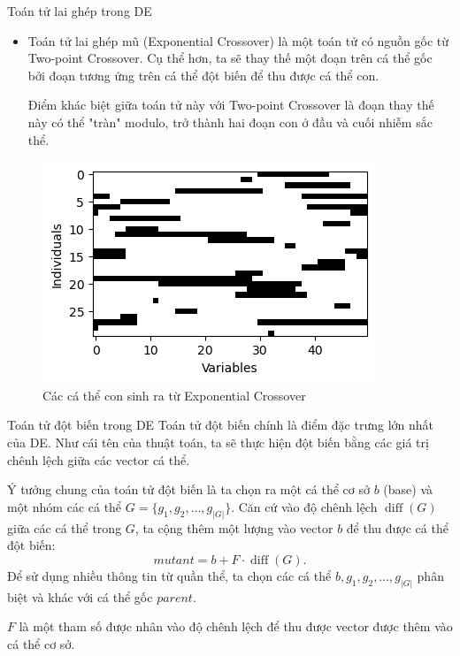 \begin{frame}{Toán tử lai ghép trong DE}
\begin{itemize}
\item Toán tử lai ghép mũ (Exponential Crossover) là một toán tử có nguồn gốc từ
  Two-point Crossover. Cụ thể hơn, ta sẽ thay thế một đoạn trên cá thể gốc
  bởi đoạn tương ứng trên cá thể đột biến để thu được cá thể con.

  Điểm khác biệt giữa toán tử này với Two-point Crossover là đoạn thay thế này
  có thể "tràn" modulo, trở thành hai đoạn con ở đầu và cuối nhiễm sắc
  thể.
\end{itemize}
  \begin{figure}
    \centering
    \includegraphics[height=0.5\textheight]{res/xx.png}
    \caption{Các cá thể con sinh ra từ Exponential Crossover}
  \end{figure}
\end{frame}

\begin{frame}{Toán tử đột biến trong DE}
  Toán tử đột biến chính là điểm đặc trưng lớn nhất của DE. Như cái tên của
  thuật toán, ta sẽ thực hiện đột biến bằng các giá trị chênh lệch giữa các
  vector cá thể.

  Ý tưởng chung của toán tử đột biến là ta chọn ra một cá thể cơ sở \( b \) (base) và
  một nhóm các cá thể \( G = \{g_{1}, g_{2}, \ldots , g_{|G|}\}  \). Căn cứ vào
  độ chênh lệch \( \operatorname{diff}(G) \) giữa các cá thể trong \( G \), ta
  cộng thêm một lượng vào vector \( b \) để thu được cá thể đột biến:
  \[
    mutant = b + F \cdot \operatorname{diff}(G)
  .\] 
  Để sử dụng nhiều thông tin từ quần thể, ta chọn các cá thể \( b, g_{1}, g_{2},
  \ldots , g_{|G|} \) phân biệt và khác với cá thể gốc \( parent \).

  \( F \) là một tham số được nhân vào độ chênh lệch để thu được vector được
  thêm vào cá thể cơ sở.
\end{frame}

